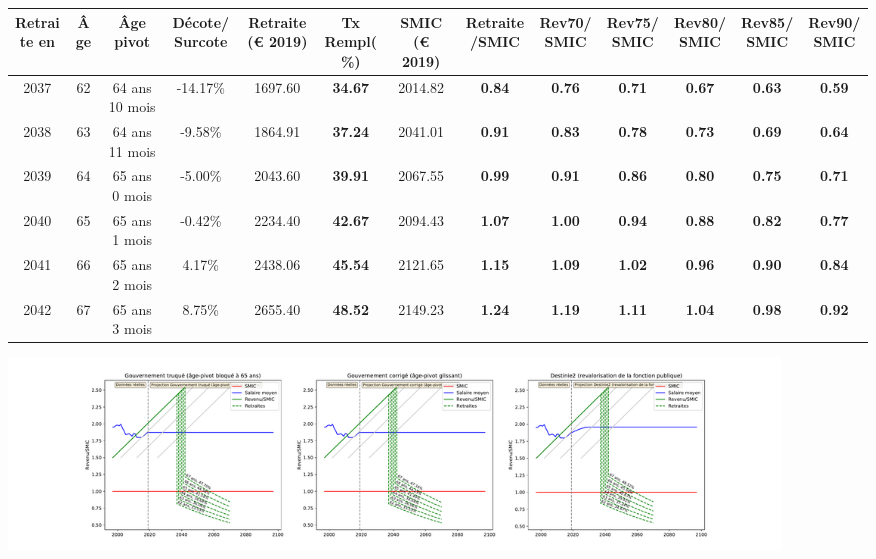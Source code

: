 { \scriptsize \begin{center} 
\begin{tabular}[htb]{|c|c||c|c||c|c||c||c|c|c|c|c|c|} 
\hline 
 Retraite en &  Âge &  Âge pivot &  Décote/Surcote &  Retraite (\euro{} 2019) &  Tx Rempl(\%) &  SMIC (\euro{} 2019) &  Retraite/SMIC &  Rev70/SMIC &  Rev75/SMIC &  Rev80/SMIC &  Rev85/SMIC &  Rev90/SMIC \\ 
\hline \hline 
 2037 &  62 &  64 ans 10 mois &  -14.17\% &  1697.60 &  {\bf 34.67} &  2014.82 &  {\bf {\color{red} 0.84}} &  {\bf {\color{red} 0.76}} &  {\bf {\color{red} 0.71}} &  {\bf {\color{red} 0.67}} &  {\bf {\color{red} 0.63}} &  {\bf {\color{red} 0.59}} \\ 
\hline 
 2038 &  63 &  64 ans 11 mois &  -9.58\% &  1864.91 &  {\bf 37.24} &  2041.01 &  {\bf {\color{red} 0.91}} &  {\bf {\color{red} 0.83}} &  {\bf {\color{red} 0.78}} &  {\bf {\color{red} 0.73}} &  {\bf {\color{red} 0.69}} &  {\bf {\color{red} 0.64}} \\ 
\hline 
 2039 &  64 &  65 ans 0 mois &  -5.00\% &  2043.60 &  {\bf 39.91} &  2067.55 &  {\bf {\color{red} 0.99}} &  {\bf {\color{red} 0.91}} &  {\bf {\color{red} 0.86}} &  {\bf {\color{red} 0.80}} &  {\bf {\color{red} 0.75}} &  {\bf {\color{red} 0.71}} \\ 
\hline 
 2040 &  65 &  65 ans 1 mois &  -0.42\% &  2234.40 &  {\bf 42.67} &  2094.43 &  {\bf 1.07} &  {\bf 1.00} &  {\bf {\color{red} 0.94}} &  {\bf {\color{red} 0.88}} &  {\bf {\color{red} 0.82}} &  {\bf {\color{red} 0.77}} \\ 
\hline 
 2041 &  66 &  65 ans 2 mois &  4.17\% &  2438.06 &  {\bf 45.54} &  2121.65 &  {\bf 1.15} &  {\bf 1.09} &  {\bf 1.02} &  {\bf {\color{red} 0.96}} &  {\bf {\color{red} 0.90}} &  {\bf {\color{red} 0.84}} \\ 
\hline 
 2042 &  67 &  65 ans 3 mois &  8.75\% &  2655.40 &  {\bf 48.52} &  2149.23 &  {\bf 1.24} &  {\bf 1.19} &  {\bf 1.11} &  {\bf 1.04} &  {\bf {\color{red} 0.98}} &  {\bf {\color{red} 0.92}} \\ 
\hline 
\hline 
\end{tabular} 
\end{center} } 

 \begin{center}\includegraphics[width=0.9\textwidth]{fig/Ascendant1525_1975_22_dest_retraite.pdf}\end{center} \label{fig/Ascendant1525_1975_22_dest_retraite.pdf} 

